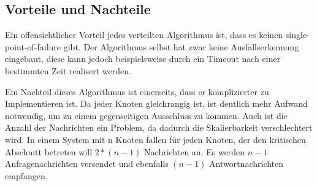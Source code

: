 \documentclass{article}
\begin{document}
\subsection{Vorteile und Nachteile}
Ein offensichtlicher Vorteil jedes verteilten Algorithmus ist, dass es keinen single-point-of-failure gibt. Der Algorithmus selbst hat zwar keine Ausfallserkennung eingebaut, diese kann jedoch beispielsweise durch ein Timeout nach einer bestimmten Zeit realisert werden.

Ein Nachteil dieses Algorithmus ist einerseits, dass er komplizierter zu Implementieren ist. Da jeder Knoten gleichrangig ist, ist deutlich mehr Aufwand notwendig, um zu einem gegenseitigen Ausschluss zu kommen. Auch ist die Anzahl der Nachrichten ein Problem, da dadurch die Skalierbarkeit verschlechtert wird. In einem System mit n Knoten fallen für jeden Knoten, der den kritischen Abschnitt betreten will \( 2 * (n - 1) \) Nachrichten an. Es werden \(n - 1\) Anfragenachrichten versendet und ebenfalls \( (n - 1) \) Antwortnachrichten empfangen.\cite{Ricart}
\end{document}
